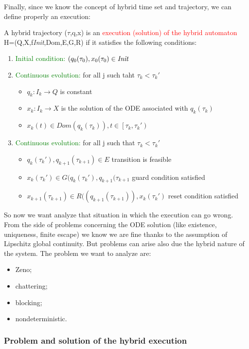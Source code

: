 Finally, since we know the concept of hybrid time set and trajectory,  we can define properly an execution:
\begin{defn} 
	A hybrid trajectory ($\tau$,q,x) is an \textcolor{red}{execution (solution) of the hybrid automaton} H=(Q,X,f\textit{Init},Dom,E,G,R) if it satisfies the following conditions:
	\begin{enumerate}
		\item \textcolor{green}{Initial condition:} $(q_0(\tau_0),x_0(\tau_0)\in \emph{Init}$
		\item \textcolor{green}{Continuous evolution:} for all j such taht $\tau_k < \tau_k'$ 
		\begin{itemize}
			\item $q_k\colon I_k\to Q$ is constant
			\item $x_k\colon I_k \to X$ is the solution of the ODE associated with $q_k(\tau_k)$
			\item $x_k(t)\in Dom(q_k(\tau_k)),t\in \left[\tau_k,\tau_k'\right)$
		\end{itemize}
		\item \textcolor{green}{Continuous evolution:} for all j such that $\tau_k < \tau_k'$ 
		\begin{itemize}
			\item $q_k(\tau_k'),q_{k+1}(\tau_{k+1})\in E$ transition is feasible
			\item $x_k(\tau_k')\in G(q_k(\tau_k'),q_{k+1}(\tau_{k+1}$ guard condition satisfied
			\item $x_{k+1}(\tau_{k+1})\in R((q_{k+1}(\tau_{k+1})),x_k(\tau_k')$ reset condition satisfied
		\end{itemize}
	\end{enumerate}
\end{defn}
So now we want analyze that situation in which the execution can go wrong. From the side of problems concerning the ODE solution (like existence, uniqueness, finite escape) we know we are fine thanks to the assumption of Lipschitz global continuity. But problems can arise also due the hybrid nature of the system. The problem we want to analyze are:
\begin{itemize}
	\item Zeno;
	\item chattering;
	\item blocking;
	\item nondeterministic.
\end{itemize}

\subsubsection{Problem and solution of the hybrid execution }
